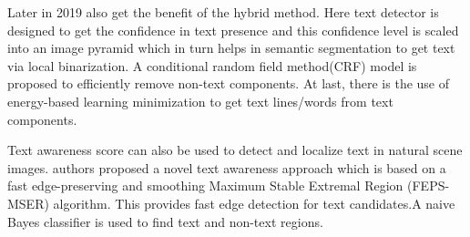 \begin{enumerate}
    Later in 2019 \cite{hybrid} also get the benefit of the hybrid method. Here text detector is designed to get the confidence in text presence and this confidence level is scaled into an image pyramid which in turn helps in semantic segmentation to get text via local binarization. A conditional random field method(CRF) model is proposed to efficiently remove non-text components. At last, there is the use of energy-based learning minimization to get text lines/words from text components.
    
    Text awareness score can also be used to detect and localize text in natural scene images.\cite{text-awareness-score} authors proposed a novel text awareness approach which is based on a fast edge-preserving and smoothing Maximum Stable Extremal Region (FEPS-MSER) algorithm. This provides fast edge detection for text candidates.A naive Bayes classifier is used to find text and non-text regions.
\end{enumerate}

